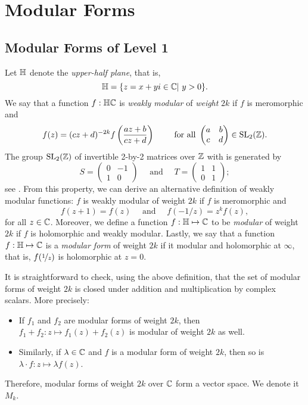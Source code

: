 \section{Modular Forms}
\subsection{Modular Forms of Level 1}
Let $\mathbb{H}$ denote the \textit{upper-half plane}, that is, 
$$\mathbb{H} = \{z = x+yi \in \mathbb{C} | \ y>0 \}.$$
We say that a function $f:\mathbb{H} 
 \mathbb{C}$ is \textit{weakly modular} of \textit{weight} $2k$ if $f$ is meromorphic and
$$
f(z) = (cz+d)^{-2k} f \left( \frac{az+b}{cz+d} \right)
\qquad \text{ for all }
\begin{pmatrix} a & b\\
				c & d
\end{pmatrix}
\in \text{SL}_{2}(\mathbb{Z}).
$$
The group $\text{SL}_{2}(\mathbb{Z})$ of invertible 2-by-2 matrices over $\mathbb{Z}$ with  is generated by
$$
S = \begin{pmatrix} 0 & -1 \\
					1 &  0
\end{pmatrix}
\quad \text{ and } \quad
T = \begin{pmatrix} 1 & 1 \\
					0 & 1 
\end{pmatrix};
$$
see \cite[p.1-2]{SL2Z}.
From this property, we can derive an alternative definition of weakly modular functions:
$f$ is weakly modular of weight $2k$ if $f$ is meromorphic and
$$
f(z+1) = f(z) \quad \text{ and } \quad f(-1/z) = z^k f(z),
$$
for all $z \in \mathbb{C}$.
Moreover, we define a function $f:\mathbb{H} \mapsto \mathbb{C}$ to be \textit{modular} of weight $2k$ if $f$ is holomorphic and weakly modular.
Lastly, we say that a function $f:\mathbb{H} \mapsto \mathbb{C}$ is a \textit{modular form} of weight $2k$ if it modular and holomorphic at $\infty$, that is, $f(\nicefrac{1}{z})$ is holomorphic at $z=0$.

It is straightforward to check, using the above definition, that the set of modular forms of weight $2k$ is closed under addition and multiplication by complex scalars.
More precisely:
\begin{itemize}
    \item If $f_1$ and $f_2$ are modular forms of weight $2k$, then $f_1+f_2: z \mapsto f_1(z)+f_2(z)$ is modular of weight $2k$ as well.
    
    \item Similarly, if $\lambda \in \mathbb{C}$ and $f$ is a modular form of weight $2k$, then so is $\lambda \cdot f: z \mapsto \lambda f(z)$.
\end{itemize}
Therefore, modular forms of weight $2k$ over $\mathbb{C}$ form a vector space. We denote it $M_k$.

